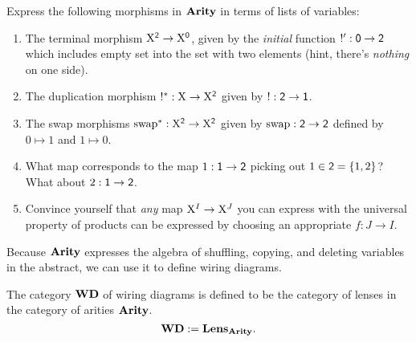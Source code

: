 \documentclass[DynamicalBook]{subfiles}
\begin{document}
\begin{exercise}
  Express the following morphisms in $\textbf{Arity}$ in terms of lists of variables:
  \begin{enumerate}
    \item The terminal morphism $\mathrm{X}^{\mathsf{2}} \to \mathrm{X}^{\mathsf{0}}$, given by the
      \emph{initial} function $!' : \mathsf{0} \to \mathsf{2}$ which includes empty
      set into the set with two elements (hint, there's \emph{nothing} on one side).
    \item The duplication morphism $!^{\ast} : \mathrm{X} \to \mathrm{X}^{\mathsf{2}}$ given by
      $! : \mathsf{2} \to \mathsf{1}$. 
    \item The swap morphisms $\mathrm{swap}^{\ast} : \mathrm{X}^{\mathsf{2}} \to
      \mathrm{X}^{\mathsf{2}}$ given by $\mathrm{swap} : \mathsf{2} \to \mathsf{2}$ defined by $0
      \mapsto 1$ and $1 \mapsto 0$.
    \item What map corresponds to the map $1 : \mathsf{1} \to \mathsf{2}$ picking out
      $1 \in \mathsf{2} = \{1, 2\}$? What about $2 : \mathsf{1} \to \mathsf{2}$. 
    \item Convince yourself that \emph{any} map $\mathrm{X}^I \to \mathrm{X}^J$ you can express with the
      universal property of products can be expressed by choosing an appropriate
      $f : J \to I$.
  \end{enumerate}
\end{exercise}

Because $\textbf{Arity}$ expresses the algebra of shuffling, copying, and deleting
variables in the abstract, we can use it to define wiring diagrams.

\begin{definition}\label{def.category_of_wiring_diagrams}
  The category $\textbf{WD}$ of wiring diagrams is defined to be the category of
  lenses in the category of arities $\textbf{Arity}$.
  $$\textbf{WD} := \textbf{Lens}_{\textbf{Arity}}.$$
\end{definition}
\end{document}
